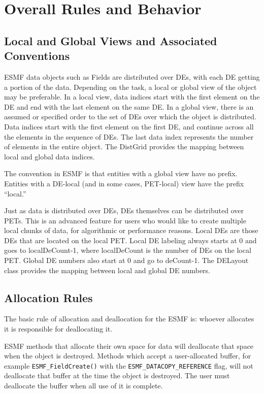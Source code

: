 \section{Overall Rules and Behavior}

\subsection{Local and Global Views and Associated Conventions}

ESMF data objects such as Fields are distributed over
DEs, with each DE getting a portion of the data.  Depending
on the task, a local or global view of the object may be
preferable.  In a local view, data indices start with the first
element on the DE and end with the last element on the same DE.
In a global view, there is an assumed or specified order to
the set of DEs over which the object is distributed.  Data
indices start with the first element on the first DE, and
continue across all the elements in the sequence of DEs.
The last data index represents the number of elements in the
entire object.  The DistGrid provides the mapping between
local and global data indices.

The convention in ESMF is that entities with a global view
have no prefix.  Entities with a DE-local (and in some cases,
PET-local) view have the prefix ``local.''

Just as data is distributed over DEs, DEs themselves can be
distributed over PETs.  This is an advanced feature for users
who would like to create multiple local chunks of data, for
algorithmic or performance reasons.
Local DEs are those DEs that are located on the local PET.
Local DE labeling always starts at 0 and goes to localDeCount-1,
where localDeCount is the number of DEs on the local PET.
Global DE numbers also start at 0 and go to deCount-1.
The DELayout class provides the mapping between local
and global DE numbers. 

\subsection{Allocation Rules}

The basic rule of allocation and deallocation for the ESMF is:
whoever allocates it is responsible for deallocating it.

\begin{sloppypar}
ESMF methods that allocate their own space for data will
deallocate that space when the object is destroyed. 
Methods which accept a user-allocated buffer, for example
{\tt ESMF\_FieldCreate()} with the {\tt ESMF\_DATACOPY\_REFERENCE} flag,
will not deallocate that buffer at the time the object is
destroyed.  The user must deallocate the buffer
when all use of it is complete.
\end{sloppypar}

